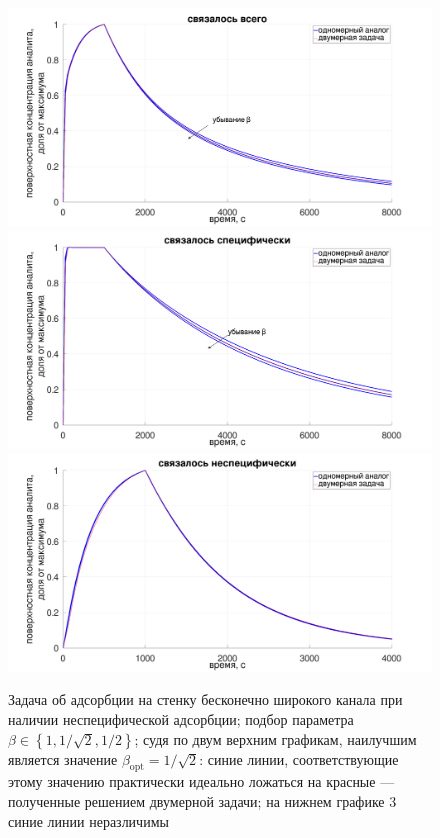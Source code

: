 \documentclass[oneside,final,12pt]{extreport}
\begin{document}
\begin{figure}
  \centering
  \includegraphics[width=.8\textwidth]{pic/flat_wide_twosurf_sum_betas}
  \includegraphics[width=.8\textwidth]{pic/flat_wide_twosurf_a_betas}
  \includegraphics[width=.8\textwidth]{pic/flat_wide_twosurf_b_betas}

  \caption{%
    \label{fig:flat_wide_twosurf_betas}%
    Задача об адсорбции на стенку бесконечно широкого канала
    при наличии неспецифической адсорбции;
    подбор параметра $\beta \in \left\{1,1/\sqrt{2},1/2\right\}$;
    судя по двум верхним графикам, наилучшим является значение
    $\beta_{\text{opt}} = 1/\sqrt{2}$:
    синие линии, соответствующие этому значению практически идеально ложаться
    на красные --- полученные решением двумерной задачи;
    на нижнем графике 3 синие линии неразличимы
  }

\end{figure}
\end{document}
